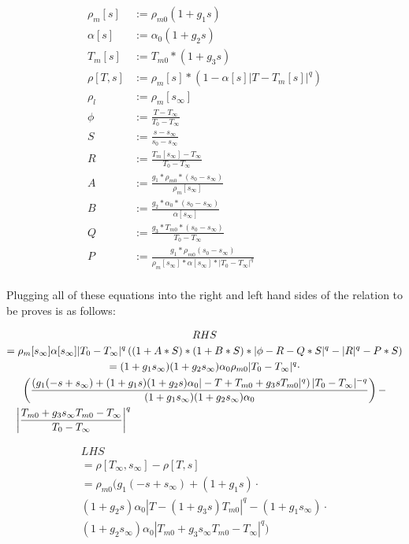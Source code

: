 \documentclass[letterpaper, 10pt]{article}
\begin{document}
	\begin{align*}
		\rho_m[s]&:=\rho_{m0}(1+g_1 s)\\
		\alpha[s]&:=\alpha_0(1+g_2 s)\\
		T_m[s]&:=T_{m0}*(1+g_3 s)\\
		\rho[T,s]&:=\rho_m[s]*\left(1-\alpha[s] |T-T_m[s]|^q\right)\\
		\rho_l&:=\rho_m[s_\infty]\\
		\phi&:=\frac{T-T_\infty}{T_0-T_\infty}\\
		S&:=\frac{s-s_\infty}{s_0-s_\infty}\\
		R&:=\frac{T_m[s_\infty]-T_\infty}{T_0-T_\infty}\\
		A&:=\frac{g_1*\rho_{m0}*(s_0-s_\infty)}{\rho_m[s_\infty]}\\
		B&:=\frac{g_2*\alpha_0*(s_0-s_\infty)}{\alpha[s_\infty]}\\
		Q&:=\frac{g_3*T_{m0}*(s_0-s_\infty)}{T_0-T_\infty}\\
		P&:=\frac{g_1*\rho_{m0}(s_0-s_\infty)}{\rho_m[s_\infty]*\alpha[s_\infty]*|T_0-T_\infty|^q}\\
	\end{align*}

	Plugging all of these equations into the right and left hand sides of the relation to be proves is as follows:

	\begin{multline*}
		RHS\\
		= \rho_m[s_\infty] \alpha[s_\infty] |T_0-T_\infty|^q \left((1+A*S)*(1+B*S)*|\phi 	-R-Q*S|^q-|R|^q-P*S\right) \\
		= (1+g_1 s_\infty) (1+g_2 s_\infty) \alpha_0 \rho_{m0} |T_0-T_\infty|^q \cdot \\
		\left(\frac{\left(g_1 (-s+s_\infty)+(1+g_1 s) (1+g_2 s) \alpha_0 |-T+T_{m0}+g_3 s T_{m0}|^q\right)
		|T_0-T_\infty|^{-q}}{(1+g_1 s_\infty) (1+g_2 s_\infty) \alpha_0}\right) -\\ 
		\shoveleft{\left|\frac{T_{m0}+g_3 s_\infty T_{m0}-T_\infty}{T_0-T_\infty}\right|^q}
	\end{multline*}

	\begin{multline*}
		LHS\\
		= \rho[T_\infty,s_\infty]-\rho [T,s]\\ 
		= \rho_{m0} (g_1 (-s+s_\infty)+(1+g_1 s) \cdot \\
		(1+g_2 s) \alpha_0 |T-(1+g_3 s) T_{m0}|^q-(1+g_1 s_\infty) \cdot\\ 
		(1+g_2 s_\infty) \alpha_0 |T_{m0}+g_3 s_\infty T_{m0}-T_\infty|^q)
	\end{multline*}
\end{document}
